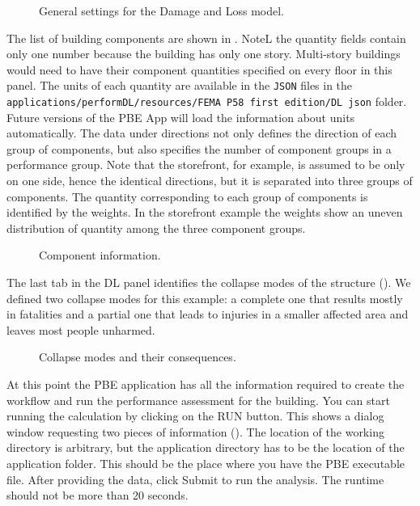 \begin{figure}[!htbp]
  \caption{General settings for the Damage and Loss model.}
  \label{fig:ex_1_DL_1}
\end{figure}

The list of building components are shown in . NoteL the quantity fields contain only one number because the building has only one story. Multi-story buildings would need to have their component quantities specified on every floor in this panel. The units of each quantity are available in the \texttt{JSON} files in the \texttt{applications/performDL/resources/FEMA P58 first edition/DL json} folder. Future versions of the PBE App will load the information about units automatically. The data under directions not only defines the direction of each group of components, but also specifies the number of component groups in a performance group. Note that the storefront, for example, is assumed to be only on one side, hence the identical directions, but it is separated into three groups of components. The quantity corresponding to each group of components is identified by the weights. In the storefront example the weights show an uneven distribution of quantity among the three component groups.\\

\begin{figure}[!htbp]
  \caption{Component information.}
  \label{fig:ex_1_DL_2}
\end{figure}

The last tab in the DL panel identifies the collapse modes of the structure (). We defined two collapse modes for this example: a complete one that results mostly in fatalities and a partial one that leads to injuries in a smaller affected area and leaves most people unharmed.\\

\begin{figure}[!htbp]
  \caption{Collapse modes and their consequences.}
  \label{fig:ex_1_DL_3}
\end{figure}

At this point the PBE application has all the information required to create the workflow and run the performance assessment for the building. You can start running the calculation by clicking on the RUN button. This shows a dialog window requesting two pieces of information (). The location of the working directory is arbitrary, but the application directory has to be the location of the application folder. This should be the place where you have the PBE executable file. After providing the data, click Submit to run the analysis. The runtime should not be more than 20 seconds. \\

